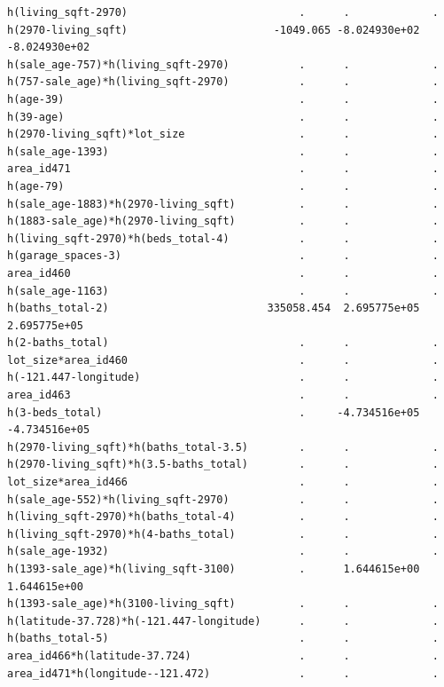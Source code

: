 \documentclass[
]{article}
\begin{document}
\begin{verbatim}
h(living_sqft-2970)                           .      .             .           
h(2970-living_sqft)                       -1049.065 -8.024930e+02 -8.024930e+02
h(sale_age-757)*h(living_sqft-2970)           .      .             .           
h(757-sale_age)*h(living_sqft-2970)           .      .             .           
h(age-39)                                     .      .             .           
h(39-age)                                     .      .             .           
h(2970-living_sqft)*lot_size                  .      .             .           
h(sale_age-1393)                              .      .             .           
area_id471                                    .      .             .           
h(age-79)                                     .      .             .           
h(sale_age-1883)*h(2970-living_sqft)          .      .             .           
h(1883-sale_age)*h(2970-living_sqft)          .      .             .           
h(living_sqft-2970)*h(beds_total-4)           .      .             .           
h(garage_spaces-3)                            .      .             .           
area_id460                                    .      .             .           
h(sale_age-1163)                              .      .             .           
h(baths_total-2)                         335058.454  2.695775e+05  2.695775e+05
h(2-baths_total)                              .      .             .           
lot_size*area_id460                           .      .             .           
h(-121.447-longitude)                         .      .             .           
area_id463                                    .      .             .           
h(3-beds_total)                               .     -4.734516e+05 -4.734516e+05
h(2970-living_sqft)*h(baths_total-3.5)        .      .             .           
h(2970-living_sqft)*h(3.5-baths_total)        .      .             .           
lot_size*area_id466                           .      .             .           
h(sale_age-552)*h(living_sqft-2970)           .      .             .           
h(living_sqft-2970)*h(baths_total-4)          .      .             .           
h(living_sqft-2970)*h(4-baths_total)          .      .             .           
h(sale_age-1932)                              .      .             .           
h(1393-sale_age)*h(living_sqft-3100)          .      1.644615e+00  1.644615e+00
h(1393-sale_age)*h(3100-living_sqft)          .      .             .           
h(latitude-37.728)*h(-121.447-longitude)      .      .             .           
h(baths_total-5)                              .      .             .           
area_id466*h(latitude-37.724)                 .      .             .           
area_id471*h(longitude--121.472)              .      .             .           
                                                                    

\end{verbatim}
\end{document}
